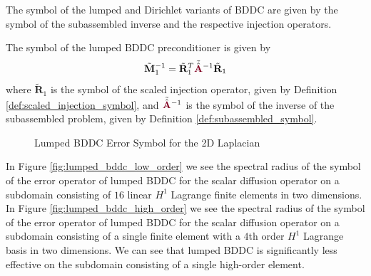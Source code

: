 The symbol of the lumped and Dirichlet variants of BDDC are given by the symbol of the subassembled inverse and the respective injection operators.

\begin{definition}
The symbol of the lumped BDDC preconditioner is given by
\begin{equation}
\tilde{\mathbf{M}}^{-1}_1 = \tilde{\mathbf{R}}^T_1 \tilde{\hat{{\color{burgundy}\mathbf{A}}}}^{-1} \tilde{\mathbf{R}}_1
\end{equation}
where $\tilde{\mathbf{R}}_1$ is the symbol of the scaled injection operator, given by Definition \ref{def:scaled_injection_symbol}, and $\tilde{\hat{{\color{burgundy}\mathbf{A}}}}^{-1}$ is the symbol of the inverse of the subassembled problem, given by Definition \ref{def:subassembled_symbol}. 
\label{def:lumped_bddc_symbol}
\end{definition}

\begin{figure}[!ht]
  \centering
  \hfill
  \caption{Lumped BDDC Error Symbol for the 2D Laplacian}
\end{figure}

In Figure \ref{fig:lumped_bddc_low_order} we see the spectral radius of the symbol of the error operator of lumped BDDC for the scalar diffusion operator on a subdomain consisting of $16$ linear $H^1$ Lagrange finite elements in two dimensions.
In Figure \ref{fig:lumped_bddc_high_order} we see the spectral radius of the symbol of the error operator of lumped BDDC for the scalar diffusion operator on a subdomain consisting of a single finite element with a $4$th order $H^1$ Lagrange basis in two dimensions.
We can see that lumped BDDC is significantly less effective on the subdomain consisting of a single high-order element.

